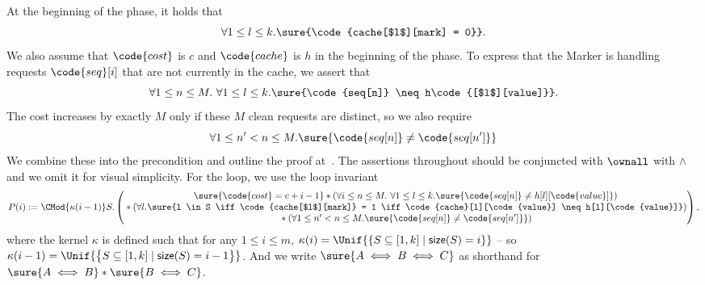 \documentclass[acmsmall,nonacm,screen,appendix]{acmart}
\begin{document}
At the beginning of the phase,
it holds that
\[
  \forall 1 \leq l \leq k. \sure{\code{cache[$l$][mark] = 0}}.
\]
We also assume that $\code{cost}$ is $c$ and $\code{cache}$ is $h$ in the beginning
of the phase.
To express that the Marker is handling requests $\code{seq}[i]$ that are not currently in the cache,
we assert that
\[
\forall 1 \leq n \leq M.\  \forall 1 \leq l \leq k. \sure{\code{seq[n]} \neq h\code{[$l$][value]}}.
\]
The cost increases by exactly $M$ only if these $M$ clean requests are distinct,
so we also require
\[
  \forall 1 \leq n' < n \leq M. \sure{\code{seq[n]} \neq \code{seq[n']}}
\]
We combine these into the precondition and outline the proof at~.
The assertions throughout should be conjuncted with $\ownall$ with $\land$ and
we omit it for visual simplicity.
For the loop, we use the loop invariant
\[
  P(i) :=
  \CMod{\kappa(i-1)} S.
        \begin{pmatrix}
             \sure{\code{cost} = c + i - 1}
           \ast \left( \forall i \leq n \leq M.\  \forall 1 \leq l \leq k. \sure{\code{seq[n]} \neq h[l][\code{value}]} \right) \\
             {} \ast \left( \forall l. \sure{l \in S \iff \code{cache[$l$][mark]} = 1 \iff \code{cache}[l][\code{value}] \neq h[l][\code{value}]} \right) \\
             {} \ast \left( \forall 1 \leq n' < n \leq M. \sure{\code{seq[n]} \neq \code{seq[n']}} \right)\\
        \end{pmatrix},
\]
where the kernel $\kappa$ is defined such that for any $1 \leq i \leq m$,
$\kappa(i) = \Unif{\{S \subseteq [1, k] \mid \textsf{size}(S) = i\}}$ --
so $\kappa(i- 1) = \Unif{\big\{S \subseteq [1, k] \mid \textsf{size}(S) = i - 1 \big\}}$.
And we write $\sure{A \iff B \iff C}$
as shorthand for $\sure{A \iff B} \ast \sure{B \iff C}$.
\end{document}
